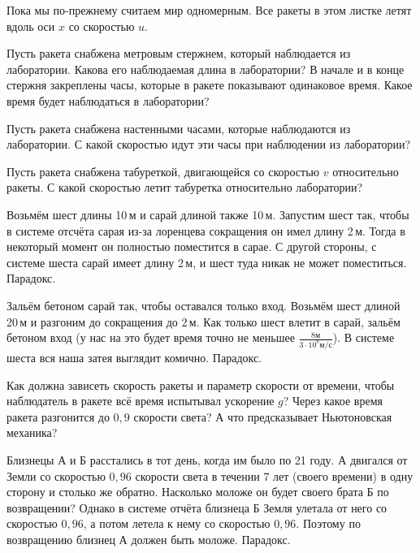 \documentclass[a4paper,12pt]{article}
\newcommand{\мв}{\,м$_в$}
\begin{document}

{\small Пока мы по-прежнему считаем мир одномерным.
Все ракеты в этом листке летят вдоль оси $x$ со скоростью $u$.

}


Пусть ракета снабжена метровым стержнем, который наблюдается из лаборатории.
Какова его наблюдаемая длина в лаборатории?
В начале и в конце стержня закреплены часы, которые в ракете показывают одинаковое время.
Какое время будет наблюдаться в лаборатории?

Пусть ракета снабжена настенными часами, которые наблюдаются из лаборатории.
С какой скоростью идут эти часы при наблюдении из лаборатории?

Пусть ракета снабжена табуреткой, двигающейся со скоростью $v$ относительно ракеты.
С какой скоростью летит табуретка относительно лаборатории?

Возьмём шест длины 10\,м и сарай длиной также 10\,м.
Запустим шест так, чтобы в системе отсчёта сарая из-за лоренцева сокращения он имел длину 2\,м.
Тогда в некоторый момент он полностью поместится в сарае.
С другой стороны, с системе шеста сарай имеет длину 2\,м, и шест туда никак не может поместиться. Парадокс.


Зальём бетоном сарай так, чтобы оставался только вход.
Возьмём шест длиной 20\,м и разгоним до сокращения до 2\,м.
Как только шест влетит в сарай, зальём бетоном вход (у нас на это будет время точно не меньшее $\frac{8м}{3\cdot10^8 м/с}$).
В системе шеста вся наша затея выглядит комично. Парадокс.



Как должна зависеть скорость ракеты и параметр скорости от времени, чтобы наблюдатель в ракете всё время испытывал ускорение $g$?
Через какое время ракета разгонится до $0{,}9$ скорости света? А что предсказывает Ньютоновская механика?

Близнецы А и Б расстались в тот день, когда им было по 21 году.
А двигался от Земли со скоростью $0{,}96$ скорости света в течении 7 лет (своего времени) в одну сторону и столько же обратно.
Насколько моложе он будет своего брата Б по возвращении?
Однако в системе отчёта близнеца Б Земля улетала от него со скоростью $0{,}96$,
а потом летела к нему со скоростью $0{,}96$.
Поэтому по возвращению близнец А должен быть моложе.
Парадокс.
\end{document}
